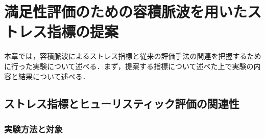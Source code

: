 \chapter{満足性評価のための容積脈波を用いたストレス指標の提案}
\label{chap:pulsewave}

本章では，容積脈波によるストレス指標と従来の評価手法の関連を把握するために行った実験について述べる．まず，提案する指標について述べた上で実験の内容と結果について述べる．


\section{ストレス指標とヒューリスティック評価の関連性}

\subsection{実験方法と対象}

